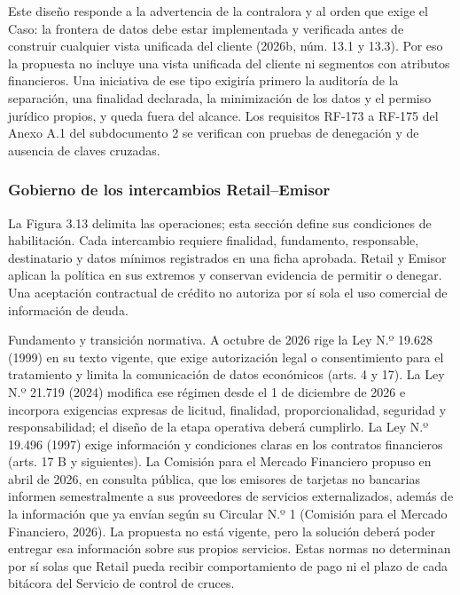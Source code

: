 \documentclass[11pt]{article}
\begin{document}
{Este diseño responde a la advertencia de la contralora y al orden que exige el Caso: la frontera de datos debe estar implementada y verificada antes de construir cualquier vista unificada del cliente (2026b, núm. 13.1 y 13.3). Por eso la propuesta no incluye una vista unificada del cliente ni segmentos con atributos financieros. Una iniciativa de ese tipo exigiría primero la auditoría de la separación, una finalidad declarada, la minimización de los datos y el permiso jurídico propios, y queda fuera del alcance. Los requisitos RF-173 a RF-175 del Anexo A.1 del subdocumento 2 se verifican con pruebas de denegación y de ausencia de claves cruzadas.}

\subsubsection{Gobierno de los intercambios Retail--Emisor}

{La Figura 3.13 delimita las operaciones; esta sección define sus condiciones de habilitación. Cada intercambio requiere finalidad, fundamento, responsable, destinatario y datos mínimos registrados en una ficha aprobada. Retail y Emisor aplican la política en sus extremos y conservan evidencia de permitir o denegar. Una aceptación contractual de crédito no autoriza por sí sola el uso comercial de información de deuda.}

{Fundamento y transición normativa. A octubre de 2026 rige la Ley N.º 19.628 (1999) en su texto vigente, que exige autorización legal o consentimiento para el tratamiento y limita la comunicación de datos económicos (arts. 4 y 17). La Ley N.º 21.719 (2024) modifica ese régimen desde el 1 de diciembre de 2026 e incorpora exigencias expresas de licitud, finalidad, proporcionalidad, seguridad y responsabilidad; el diseño de la etapa operativa deberá cumplirlo. La Ley N.º 19.496 (1997) exige información y condiciones claras en los contratos financieros (arts. 17 B y siguientes). La Comisión para el Mercado Financiero propuso en abril de 2026, en consulta pública, que los emisores de tarjetas no bancarias informen semestralmente a sus proveedores de servicios externalizados, además de la información que ya envían según su Circular N.º 1 (Comisión para el Mercado Financiero, 2026). La propuesta no está vigente, pero la solución deberá poder entregar esa información sobre sus propios servicios. Estas normas no determinan por sí solas que Retail pueda recibir comportamiento de pago ni el plazo de cada bitácora del Servicio de control de cruces.}
\end{document}
